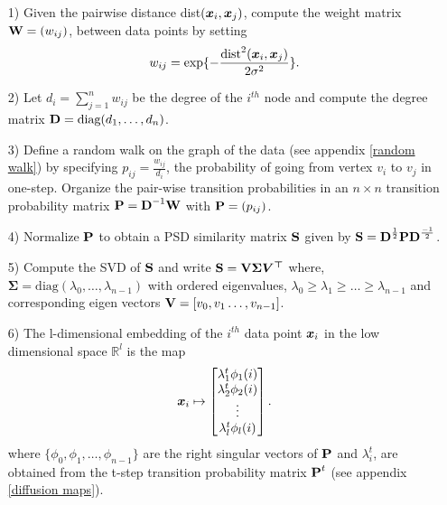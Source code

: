 \begin{itemize}
\item[1)] Given the pairwise distance dist$(\boldsymbol{x}_i, \boldsymbol{x}_j)$, compute the weight matrix 
$\textbf{W} = (w_{ij})$, between data points by setting
$$w_{ij} = \displaystyle \exp \{- \frac{\text{dist}^{2}(\boldsymbol{x}_i, \boldsymbol{x}_j)}{2 \sigma^2} \}.$$
\item[2)] Let $d_{i} = \sum_{j = 1}^{n} w_{ij}$ be the degree of the $i^{th}$ node and compute the degree matrix $\textbf{D} = \text{diag}(d_{1}, \ldots, d_{n})$.
\item[3)] Define a random walk on the graph of the data (see appendix \ref{random walk}) by specifying $p_{ij} = \displaystyle \frac{w_{ij}}{d_{i}}$, the probability of going from vertex $v_i$ to $v_j$ in one-step. Organize the pair-wise transition probabilities in an $n \times n$ 
transition probability matrix $\textbf{P} = \textbf{D}^{-1}\textbf{W}$ with $\textbf{P} = (p_{ij})$.
\item[4)] Normalize $\textbf{P}$ to obtain a PSD similarity matrix $\textbf{S}$ given by
$\textbf{S} = \textbf{D}^{\frac{1}{2}}\textbf{P}\textbf{D}^{\frac{-1}{2}}$.
\item[5)] Compute the SVD of $\textbf{S}$ and write $\textbf{S} = \textbf{V}\bm{\Sigma}\bm{V^{\top}}$ where,
$\bm{\Sigma} = \text{diag}(\lambda_{0}, \ldots, \lambda_{n-1})$ with ordered eigenvalues, 
$\lambda_{0}\geq \lambda_{1} \geq \ldots \geq \lambda_{n-1}$ and corresponding eigen vectors 
$\textbf{V} = [v_0, v_1 \ldots, v_{n-1}]$.
\item[6)] The l-dimensional embedding of the $i^{th}$ data point $\boldsymbol{x}_i$
in the low dimensional space $\mathbb{R}^{l}$ is the map
$$ \boldsymbol{x}_{i} \mapsto  \begin{bmatrix}
         \lambda_{1}^{t}\phi_{1}(i)\\
         \lambda_{2}^{t}\phi_{2}(i)\\
         \vdots\\
         \lambda_{l}^{t}\phi_{l}(i)
        \end{bmatrix} .$$
where $\{ \phi_{0}, \phi_{1}, \ldots, \phi_{n-1} \}$ are the right singular vectors of $\textbf{P}$
and $\lambda_{i}^{t}$, are obtained from the t-step transition probability matrix $\textbf{P}^{t}$
(see appendix \ref{diffusion maps}).
\end{itemize}































